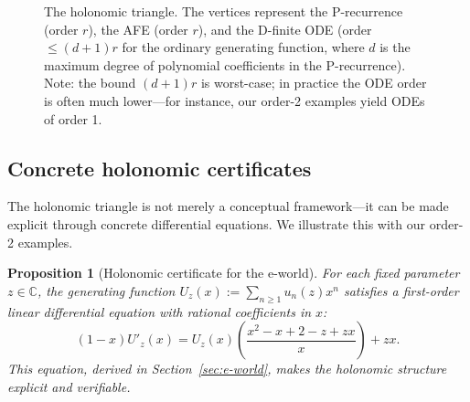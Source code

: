 \documentclass[11pt,reqno]{amsart}
\newtheorem{proposition}[theorem]{Proposition}
\theoremstyle{definition}
\newcommand{\C}{\mathbb{C}}
\newcommand{\ee}{\mathrm{e}}
\numberwithin{equation}{section}
\begin{document}
\begin{figure}[ht]
\centering
{}
\vspace{0.5em}
\caption{The holonomic triangle. The vertices represent the P-recurrence (order $r$), the AFE (order $r$), and the D-finite ODE (order $\leq (d+1)r$ for the ordinary generating function, where $d$ is the maximum degree of polynomial coefficients in the P-recurrence). Note: the bound $(d+1)r$ is worst-case; in practice the ODE order is often much lower---for instance, our order-2 examples yield ODEs of order 1.}
\label{fig:triangle}
\end{figure}

\subsection{Concrete holonomic certificates}

The holonomic triangle is not merely a conceptual framework—it can be made explicit through concrete differential equations. We illustrate this with our order-2 examples.

\begin{proposition}[Holonomic certificate for the $\ee$-world]\label{prop:GF-ODE-e}
For each fixed parameter $z\in\C$, the generating function $U_z(x) := \sum_{n\ge1}u_n(z)x^n$ satisfies a first-order linear differential equation with rational coefficients in $x$:
\[
  (1-x)U'_z(x) = U_z(x) \left(\frac{x^2-x+2-z+zx}{x}\right) + zx.
\]
This equation, derived in Section~\ref{sec:e-world}, makes the holonomic structure explicit and verifiable.
\end{proposition}
\end{document}
